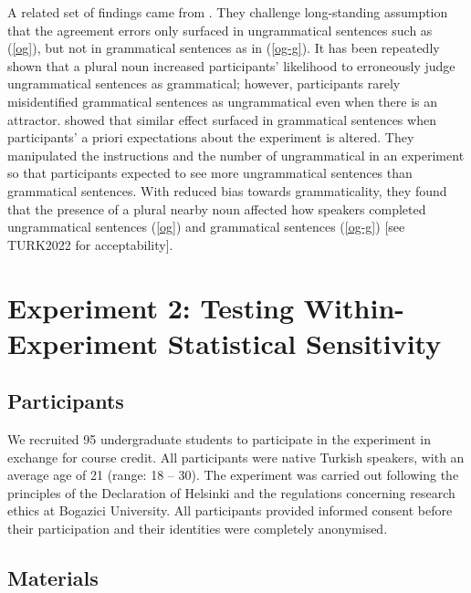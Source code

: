 \documentclass[
  authoryear,
  3p]{elsarticle}
\begin{document}
A related set of findings came from \citet{HammerlyEtAl2019}. They
challenge long-standing assumption that the agreement errors only
surfaced in ungrammatical sentences such as (\ref{og}), but not in
grammatical sentences as in (\ref{og-g}). It has been repeatedly shown
that a plural noun increased participants' likelihood to erroneously
judge ungrammatical sentences as grammatical; however, participants
rarely misidentified grammatical sentences as ungrammatical even when
there is an attractor. \citet{HammerlyEtAl2019} showed that similar
effect surfaced in grammatical sentences when participants' a priori
expectations about the experiment is altered. They manipulated the
instructions and the number of ungrammatical in an experiment so that
participants expected to see more ungrammatical sentences than
grammatical sentences. With reduced bias towards grammaticality, they
found that the presence of a plural nearby noun affected how speakers
completed ungrammatical sentences (\ref{og}) and grammatical sentences
(\ref{og-g}) {[}see TURK2022 for acceptability{]}.

\begin{exe}
\end{exe}

\section{Experiment 2: Testing Within-Experiment Statistical
Sensitivity}\label{experiment-2-testing-within-experiment-statistical-sensitivity}

\subsection{Participants}\label{participants-1}

We recruited 95 undergraduate students to participate in the experiment
in exchange for course credit. All participants were native Turkish
speakers, with an average age of 21 (range: 18 -- 30). The experiment
was carried out following the principles of the Declaration of Helsinki
and the regulations concerning research ethics at Bogazici University.
All participants provided informed consent before their participation
and their identities were completely anonymised.

\subsection{Materials}\label{materials-1}
\end{document}
